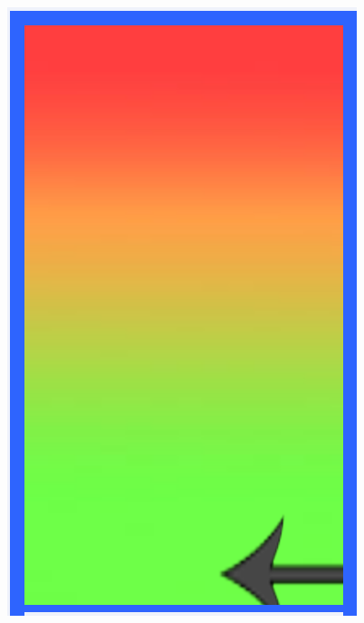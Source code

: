 \begin{figure}[H]
\begin{minipage}[c]{.3\textwidth}
	\includegraphics[width=\textwidth]{Figures/pressure.png}
	\label{feedback-pressure}
	\end{minipage}
\end{figure}
%
